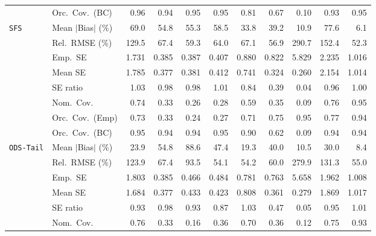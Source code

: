 \begin{landscape}
\begin{longtable}{llrrrrrrrrr}
 & Orc.\ Cov.\ (BC) & \cellcolor{ranktwo}0.96 & \cellcolor{ranktwo}0.94 & \cellcolor{rankone}0.95 & \cellcolor{rankone}0.95 & 0.81 & 0.67 & 0.10 & \cellcolor{rankthree}0.93 & \cellcolor{rankone}0.95 \\
\addlinespace[2pt]
\quad \texttt{SFS} & Mean $|$Bias$|$ (\%) & 69.0 & 54.8 & 55.3 & 58.5 & \cellcolor{rankthree}33.8 & 39.2 & \cellcolor{ranktwo}10.9 & 77.6 & \cellcolor{rankone}6.1 \\
 & Rel.\ RMSE (\%) & 129.5 & 67.4 & \cellcolor{rankthree}59.3 & 64.0 & 67.1 & \cellcolor{ranktwo}56.9 & 290.7 & 152.4 & \cellcolor{rankone}52.3 \\
 & Emp.\ SE & 1.731 & 0.385 & 0.387 & 0.407 & 0.880 & 0.822 & 5.829 & 2.235 & 1.016 \\
 & Mean SE & 1.785 & 0.377 & 0.381 & 0.412 & 0.741 & 0.324 & 0.260 & 2.154 & 1.014 \\
 & SE ratio & 1.03 & \cellcolor{rankthree}0.98 & \cellcolor{rankthree}0.98 & \cellcolor{ranktwo}1.01 & 0.84 & 0.39 & 0.04 & 0.96 & \cellcolor{rankone}1.00 \\
 & Nom.\ Cov. & \cellcolor{rankthree}0.74 & 0.33 & 0.26 & 0.28 & 0.59 & 0.35 & 0.09 & \cellcolor{ranktwo}0.76 & \cellcolor{rankone}0.95 \\
 & Orc.\ Cov.\ (Emp) & 0.73 & 0.33 & 0.24 & 0.27 & 0.71 & 0.75 & \cellcolor{rankone}0.95 & \cellcolor{rankthree}0.77 & \cellcolor{ranktwo}0.94 \\
 & Orc.\ Cov.\ (BC) & \cellcolor{rankone}0.95 & \cellcolor{ranktwo}0.94 & \cellcolor{ranktwo}0.94 & \cellcolor{rankone}0.95 & \cellcolor{rankthree}0.90 & 0.62 & 0.09 & \cellcolor{ranktwo}0.94 & \cellcolor{ranktwo}0.94 \\
\addlinespace[2pt]
\quad \texttt{ODS-Tail} & Mean $|$Bias$|$ (\%) & 23.9 & 54.8 & 88.6 & 47.4 & \cellcolor{rankthree}19.3 & 40.0 & \cellcolor{ranktwo}10.5 & 30.0 & \cellcolor{rankone}8.4 \\
 & Rel.\ RMSE (\%) & 123.9 & 67.4 & 93.5 & \cellcolor{rankone}54.1 & \cellcolor{ranktwo}54.2 & 60.0 & 279.9 & 131.3 & \cellcolor{rankthree}55.0 \\
 & Emp.\ SE & 1.803 & 0.385 & 0.466 & 0.484 & 0.781 & 0.763 & 5.658 & 1.962 & 1.008 \\
 & Mean SE & 1.684 & 0.377 & 0.433 & 0.423 & 0.808 & 0.361 & 0.279 & 1.869 & 1.017 \\
 & SE ratio & 0.93 & \cellcolor{ranktwo}0.98 & 0.93 & 0.87 & \cellcolor{rankthree}1.03 & 0.47 & 0.05 & 0.95 & \cellcolor{rankone}1.01 \\
 & Nom.\ Cov. & \cellcolor{ranktwo}0.76 & 0.33 & 0.16 & 0.36 & 0.70 & 0.36 & 0.12 & \cellcolor{rankthree}0.75 & \cellcolor{rankone}0.93 \\

\end{longtable}
\end{landscape}
